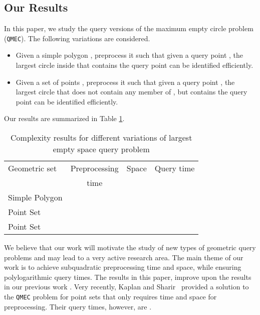 \documentclass[12pt]{llncs}
\begin{document}
\subsection{Our Results}
In this paper, we  study the query versions of the maximum empty circle  problem ({\tt QMEC}).  
The following variations are considered. 
\begin{itemize}
\item Given a simple polygon , preprocess it 
such that given a query point , the largest circle inside  
that contains the query point  can be identified efficiently.
\item Given a set of points , preprocess it such 
that given a query point , the largest circle that does not contain 
any member of , but contains the query point  can be identified 
efficiently.
\end{itemize}
Our results are summarized in Table 
\ref{TAB1}.
\begin{table} \caption{Complexity results for different variations 
of largest empty space query problem}
\begin{center}
\begin{tabular}{|l|c|c|c|} \hline 
Geometric set  & Preprocessing & Space & Query
time \\ 
&  time  &  & \\ \hline 
Simple Polygon &   &  & 
 \\ \hline 
Point Set &   &  &  
\\ \hline
Point Set &   &  &  
\\ \hline
\end{tabular}
\end{center}
\label{TAB1}
\vspace{-0.15in}
\end{table}

We believe that our work will motivate the study of new types of geometric 
query problems and may lead to a very active research area. The main 
theme of our work is to achieve  subquadratic preprocessing time and space, while ensuring 
polylogarithmic query times. 
The results in this paper, improve upon the results in our previous 
work  \cite{ADMNRS10}. Very recently, Kaplan and Sharir\ \cite{KS12} provided a solution to the {\tt QMEC} problem for point sets that only requires  time and  space for preprocessing. Their query times, however, are .
\end{document}
